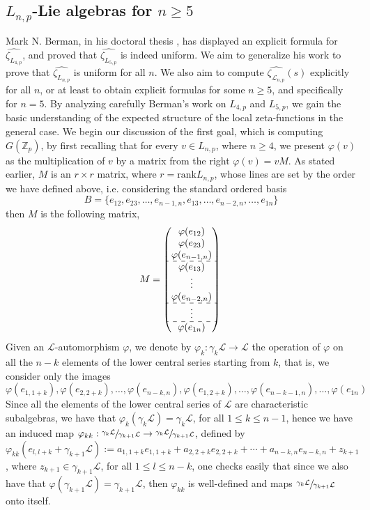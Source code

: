 \documentclass[12pt]{article}
\begin{document}
\subsection{$L_{n,p}$-Lie algebras for $n\geq{5}$}
Mark N. Berman, in his doctoral thesis \cite{Berman}, has displayed an explicit formula for $\hat{\zeta_{L_{4,p}}}$, and proved that $\hat{\zeta_{L_{5,p}}}$ is indeed uniform. We aim to generalize his work to prove that $\hat{\zeta_{L_{n,p}}}$ is uniform for all $n$. We also aim to compute $\hat{\zeta_{\mathcal{L}_{n,p}}}(s)$ explicitly for all $n$, or at least to obtain explicit formulas for some $n\geq 5$, and specifically for $n=5$. By analyzing carefully Berman's work on $L_{4,p}$ and $L_{5,p}$, we gain the basic understanding of the expected structure of the local zeta-functions in the general case.
We begin our discussion of the first goal, which is computing $G(\mathbb{Z}_p)$, by first recalling that for every $v\in L_{n,p}$, where $n\geq{4}$, we present $\varphi(v)$ as the multiplication of $v$ by a matrix from the right $\varphi(v)=vM$. As stated earlier, $M$ is an $r\times r$ matrix, where $r=\mathrm{rank}L_{n,p}$, whose lines are set by the order we have defined above, i.e. considering the standard ordered basis \[B=\{e_{
12},e_{23},\dots,e_{n-1,n},e_{13},\dots,e_{n-2,n},\dots,e_{1n}\}\] then $M$ is the following matrix,
$$
M=\begin{pmatrix}
\varphi(e_{12})\\
\varphi(e_{23})\\
\varphi(e_{n-1,n})\\
\hdashline
\varphi(e_{13})\\
\vdots\\
\varphi(e_{n-2,n})\\
\hdashline
\vdots\\
\hdashline
\varphi(e_{1n})\\
\end{pmatrix}\\
$$
Given an $\mathcal{L}$-automorphism $\varphi$, we denote by $\varphi_k:\gamma_k\mathcal{L}\rightarrow\mathcal{L}$ the operation of $\varphi$ on all the $n-k$ elements of the lower central series starting from $k$, that is, we consider only the images \[\varphi(e_{1,1+k}),\varphi(e_{2,2+k}),\dots,\varphi(e_{n-k,n}),\varphi(e_{1,2+k}),\dots,\varphi(e_{n-k-1,n}),\dots,\varphi(e_{1n})\]
Since all the elements of the lower central series of $\mathcal{L}$ are characteristic subalgebras, we have that $\varphi_k(\gamma_k\mathcal{L})=\gamma_k\mathcal{L}$, for all $1\leq{k}\leq{n-1}$, hence we have an induced map $\varphi_{kk}:\sfrac{\gamma_k\mathcal{L}}{\gamma_{k+1}\mathcal{L}}\rightarrow\sfrac{\gamma_k\mathcal{L}}{\gamma_{k+1}\mathcal{L}}$, defined by $\varphi_{kk}(e_{l,l+k}+\gamma_{k+1}\mathcal{L}):=a_{1,1+k}e_{1,1+k}+a_{2,2+k}e_{2,2+k}+\cdots+a_{n-k,n}e_{n-k,n}+z_{k+1}$, where $z_{k+1}\in\gamma_{k+1}\mathcal{L}$, for all $1\leq{l}\leq{n-k}$, one checks easily that since we also have that $\varphi(\gamma_{k+1}\mathcal{L})=\gamma_{k+1}\mathcal{L}$, then $\varphi_{kk}$ is well-defined and maps $\sfrac{\gamma_{k}\mathcal{L}}{\gamma_{k+1}\mathcal{L}}$ onto itself.
\end{document}
